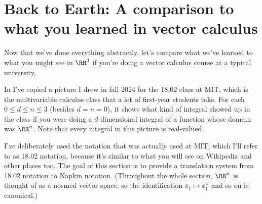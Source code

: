 \section{Back to Earth: A comparison to what you learned in vector calculus}
Now that we've done everything abstractly,
let's compare what we've learned to what you might see in $\RR^3$
if you're doing a vector calculus course at a typical university.

In  I've copied a picture I drew in fall 2024
for the 18.02 class at MIT,
which is the multivariable calculus class that a lot of first-year students take.
For each $0 \le d \le n \le 3$ (besides $d=n=0$),
it shows what kind of integral showed up in the class
if you were doing a $d$-dimensional integral of a function whose domain was $\RR^n$.
Note that every integral in this picture is real-valued.

I've deliberately used the notation that was actually used at MIT,
which I'll refer to as 18.02 notation,
because it's similar to what you will see on Wikipedia and other places too.
The goal of this section is to provide a translation system from 18.02 notation to Napkin notation.
(Throughout the whole section, $\RR^n$ is thought of as a normed vector space,
so the identification $\ee_1 \mapsto \ee_1^\vee$ and so on is canonical.)

